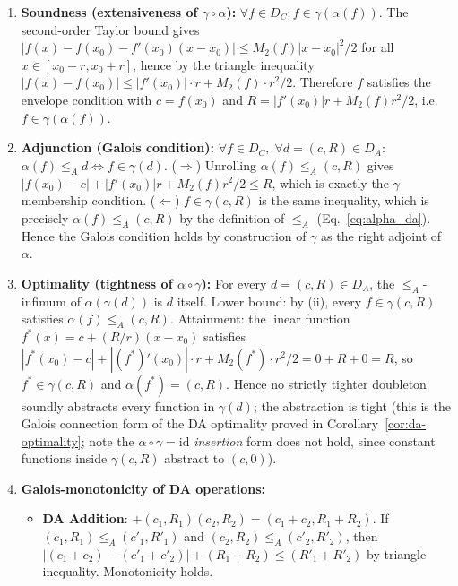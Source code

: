 \begin{enumerate}[label=(\roman*)]
    \item \textbf{Soundness (extensiveness of $\gamma \circ \alpha$):}
    $\forall f \in D_C: f \in \gamma(\alpha(f))$. The second-order
    Taylor bound gives
    $|f(x) - f(x_0) - f'(x_0)(x-x_0)| \leq M_2(f)|x-x_0|^2/2$ for all
    $x \in [x_0-r, x_0+r]$, hence by the triangle inequality
    $|f(x) - f(x_0)| \leq |f'(x_0)| \cdot r + M_2(f) \cdot r^2/2$.
    Therefore $f$ satisfies the envelope condition with
    $c = f(x_0)$ and $R = |f'(x_0)|r + M_2(f)r^2/2$, i.e.
    $f \in \gamma(\alpha(f))$.

    \item \textbf{Adjunction (Galois condition):}
    $\forall f \in D_C,\; \forall d = (c,R) \in D_A$:
    $\alpha(f) \leq_A d \iff f \in \gamma(d)$.
    ($\Rightarrow$) Unrolling $\alpha(f) \leq_A (c,R)$ gives
    $|f(x_0) - c| + |f'(x_0)|r + M_2(f)r^2/2 \leq R$, which is
    exactly the $\gamma$ membership condition.
    ($\Leftarrow$) $f \in \gamma(c,R)$ is the same inequality, which
    is precisely $\alpha(f) \leq_A (c,R)$ by the definition of
    $\leq_A$ (Eq.~\ref{eq:alpha_da}). Hence the Galois condition
    holds by construction of $\gamma$ as the right adjoint of
    $\alpha$.

    \item \textbf{Optimality (tightness of $\alpha \circ \gamma$):}
    For every $d = (c,R) \in D_A$, the $\leq_A$-infimum of
    $\alpha(\gamma(d))$ is $d$ itself. Lower bound: by (ii),
    every $f \in \gamma(c,R)$ satisfies $\alpha(f) \leq_A (c,R)$.
    Attainment: the linear function
    $f^*(x) = c + (R/r)(x-x_0)$ satisfies
    $|f^*(x_0) - c| + |(f^*)'(x_0)| \cdot r + M_2(f^*) \cdot r^2/2
    = 0 + R + 0 = R$,
    so $f^* \in \gamma(c,R)$ and $\alpha(f^*) = (c, R)$. Hence no
    strictly tighter doubleton soundly abstracts every function in
    $\gamma(d)$; the abstraction is tight (this is the Galois
    connection form of the DA optimality proved in
    Corollary~\ref{cor:da-optimality}; note the $\alpha \circ \gamma
    = \text{id}$ \emph{insertion} form does not hold, since constant
    functions inside $\gamma(c,R)$ abstract to $(c,0)$).

    \item \textbf{Galois-monotonicity of DA operations:}
    \begin{itemize}
        \item \textbf{DA Addition}: $+(c_1,R_1)(c_2,R_2) = (c_1+c_2,
        R_1+R_2)$. If $(c_1,R_1) \leq_A (c'_1,R'_1)$ and
        $(c_2,R_2) \leq_A (c'_2,R'_2)$, then $|(c_1+c_2)-(c'_1+c'_2)|
        + (R_1+R_2) \leq (R'_1+R'_2)$ by triangle inequality.
        Monotonicity holds.


\end{itemize}
\end{enumerate}
